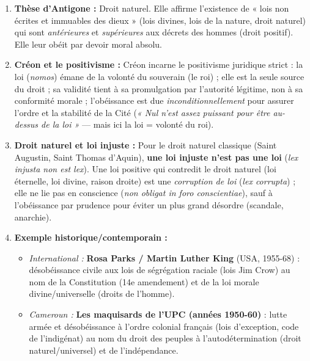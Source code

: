 \documentclass[11pt]{article}
\newcommand{\cle}[1]{{\popxbold\color{popdark}#1}}
\begin{document}
\begin{corrige}
\begin{enumerate}
\item \textbf{Thèse d'Antigone :} \cle{Droit naturel}. Elle affirme l'existence de « lois non écrites et immuables des dieux » (lois divines, lois de la nature, droit naturel) qui sont \emph{antérieures} et \emph{supérieures} aux décrets des hommes (droit positif). Elle leur obéit par devoir moral absolu.
\item \textbf{Créon et le positivisme :} Créon incarne le \cle{positivisme juridique strict} : la loi (\emph{nomos}) émane de la volonté du souverain (le roi) ; elle est la seule source du droit ; sa validité tient à sa promulgation par l'autorité légitime, non à sa conformité morale ; l'obéissance est due \emph{inconditionnellement} pour assurer l'ordre et la stabilité de la Cité (\emph{« Nul n'est assez puissant pour être au-dessus de la loi »} — mais ici la loi = volonté du roi).
\item \textbf{Droit naturel et loi injuste :} Pour le droit naturel classique (Saint Augustin, Saint Thomas d'Aquin), \textbf{une loi injuste n'est pas une loi} (\emph{lex injusta non est lex}). Une loi positive qui contredit le droit naturel (loi éternelle, loi divine, raison droite) est une \emph{corruption de loi} (\emph{lex corrupta}) ; elle ne lie pas en conscience (\emph{non obligat in foro conscientiae}), sauf à l'obéissance par prudence pour éviter un plus grand désordre (scandale, anarchie).
\item \textbf{Exemple historique/contemporain :}
      \begin{itemize}
      \item \emph{International :} \textbf{Rosa Parks / Martin Luther King} (USA, 1955-68) : désobéissance civile aux lois de ségrégation raciale (lois Jim Crow) au nom de la Constitution (14e amendement) et de la loi morale divine/universelle (droits de l'homme).
      \item \emph{Cameroun :} \textbf{Les maquisards de l'UPC (années 1950-60)} : lutte armée et désobéissance à l'ordre colonial français (lois d'exception, code de l'indigénat) au nom du droit des peuples à l'autodétermination (droit naturel/universel) et de l'indépendance.
      \end{itemize}
\end{enumerate}
\end{corrige}
\end{document}
